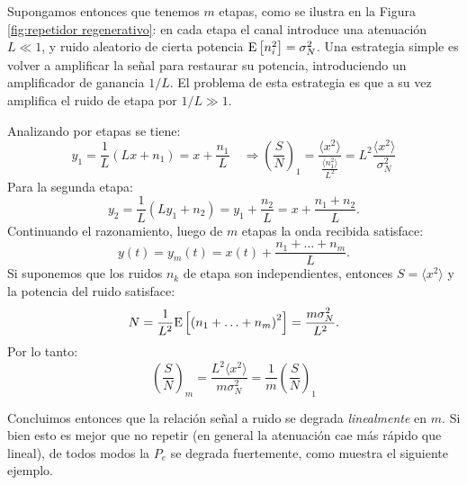 Supongamos entonces que tenemos $m$ etapas, como se ilustra en la Figura \ref{fig:repetidor regenerativo}: en cada etapa el canal introduce una atenuación $L \ll 1$, y ruido aleatorio de cierta potencia $\mathrm{E}\left[n_i^2\right]=\sigma_N^2$. Una estrategia simple es volver a amplificar la señal para restaurar su potencia, introduciendo un amplificador de ganancia $1/L$. El problema de esta estrategia es que a su vez amplifica el ruido de etapa por $1/L \gg 1$.

Analizando por etapas se tiene:
\begin{equation*}
  y_1 = \frac{1}{L}\left(Lx + n_1\right) = x + \frac{n_1}{L}  \quad \Rightarrow \left(\frac{S}{N}\right)_1 = \frac{\langle x^2 \rangle}{\frac{\langle n_1^2\rangle}{L^2}} = L^2 \frac{\langle x^2\rangle}{\sigma_N^2}
\end{equation*}
Para la segunda etapa:
\begin{equation*}
  y_2 = \frac{1}{L}\left(Ly_1 + n_2\right) = y_1 + \frac{n_2}{L} = x+ \frac{n_1+n_2}{L}.
\end{equation*}
Continuando el razonamiento, luego de $m$ etapas la onda recibida satisface:
\begin{equation*}
  y(t) = y_m(t) = x(t) + \frac{n_1+\ldots+n_m}{L}.
\end{equation*}
Si suponemos que los ruidos $n_k$ de etapa son independientes, entonces $S=\langle x^2 \rangle$ y la potencia del ruido satisface:
\begin{equation*}
N = \frac{1}{L^2} \mathrm{E}\left[\left(n_1+\ldots + n_m\right)^2\right] = \frac{m\sigma_N^2}{L^2}.    
\end{equation*}
Por lo tanto:
\begin{equation*}
 \left(\frac{S}{N}\right)_m = \frac{L^2 \langle x^2\rangle}{m \sigma_N^2}  = \frac{1}{m}\left(\frac{S}{N}\right)_1
\end{equation*}

Concluimos entonces que la relación señal a ruido se degrada \emph{linealmente} en $m$. Si bien esto es mejor que no repetir (en general la atenuación cae más rápido que lineal), de todos modos la $P_e$ se degrada fuertemente, como muestra el siguiente ejemplo.

